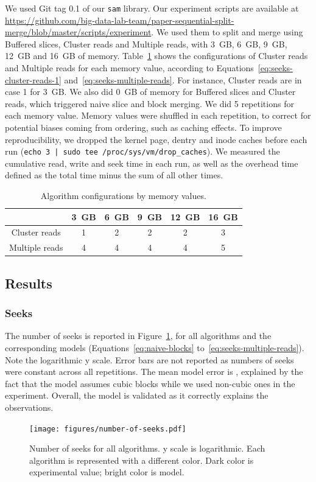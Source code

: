 \documentclass[10pt, conference, compsocconf]{IEEEtran}
\newcommand{\todo}[1]{\marginpar{\parbox{18mm}{\flushleft\tiny\color{red}\textbf{TODO}:
      #1}}}
\begin{document}
We used Git tag 0.1 of our \texttt{sam} library. Our experiment
scripts are available at
\url{https://github.com/big-data-lab-team/paper-sequential-split-merge/blob/master/scripts/experiment}. We
used them to split and merge using Buffered slices, Cluster reads and
Multiple reads, with 3~GB, 6~GB, 9~GB, 12~GB and 16~GB of
memory. Table~\ref{table:configs} shows the configurations of Cluster
reads and Multiple reads for each memory value, according to
Equations~\ref{eq:seeks-cluster-reads-1}
and~\ref{eq:seeks-multiple-reads}. For instance, Cluster reads are in
case 1 for 3~GB. We also did 0~GB of memory for Buffered slices and
Cluster reads, which triggered naive slice and block merging. We did 5
repetitions for each memory value. Memory values were shuffled in each
repetition, to correct for potential biases coming from ordering, such
as caching effects. To improve reproducibility, we dropped the kernel
page, dentry and inode caches before each run (\texttt{echo 3 | sudo
  tee /proc/sys/vm/drop\_caches}). We measured the cumulative read,
write and seek time in each run, as well as the overhead time defined
as the total time minus the sum of all other times.
\begin{table}
  \centering
\begin{footnotesize}
\begin{tabular}{|c|ccccc|}
  \hline
                 & 3~GB & 6~GB & 9~GB & 12~GB & 16~GB\\
  \hline
  Cluster  reads &  1 &  2 &  2 &  2 &  3 \\
  Multiple reads &  4 &  4 &  4 &  4 &  5\\
  \hline
\end{tabular}
\end{footnotesize}
\caption{Algorithm configurations by memory values.}
\label{table:configs}
\end{table}

\subsection{Results}

\subsubsection{Seeks}

The number of seeks is reported in Figure~\ref{fig:number-of-seeks},
for all algorithms and the corresponding models
(Equations~\ref{eq:naive-blocks}
to~\ref{eq:seeks-multiple-reads}). Note the logarithmic y scale. Error
bars are not reported as numbers of seeks were constant across all
repetitions. The mean model error is \todo{x\%}, explained by the fact
that the model assumes cubic blocks while we used non-cubic ones in
the experiment. Overall, the model is validated as it correctly
explains the observations.  
\begin{figure}[h]
  \centering
  \texttt{[image: figures/number-of-seeks.pdf]}
  \hfill
  \caption{Number of seeks for all algorithms. y scale is logarithmic. Each algorithm is
    represented with a different color. Dark color is experimental
    value; bright color is model.}
\label{fig:number-of-seeks}
\end{figure}
\end{document}
